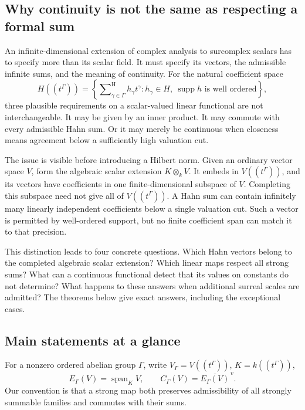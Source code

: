 \documentclass[11pt,letterpaper]{article}
\numberwithin{equation}{section}
\theoremstyle{definition}
\theoremstyle{remark}
\newcommand{\supp}{\operatorname{supp}}
\newcommand{\Span}{\operatorname{span}}
\newcommand{\sH}{\mathop{\sum}\nolimits^{\mathrm H}}
\begin{document}
\subsection{Why continuity is not the same as respecting a formal sum}
An infinite-dimensional extension of complex analysis to surcomplex
scalars has to specify more than its scalar field. It must specify its
vectors, the admissible infinite sums, and the meaning of continuity.
For the natural coefficient space
\[
 H((t^\Gamma))=\left\{\sH_{\gamma\in\Gamma}h_\gamma t^\gamma:
 h_\gamma\in H,\ \supp h\text{ is well ordered}\right\},
\]
three plausible requirements on a scalar-valued linear functional are
not interchangeable. It may be given by an inner product. It may commute
with every admissible Hahn sum. Or it may merely be continuous when
closeness means agreement below a sufficiently high valuation cut.

The issue is visible before introducing a Hilbert norm. Given an
ordinary vector space $V$, form the algebraic scalar extension
$K\otimes_k V$. It embeds in $V((t^\Gamma))$, and its vectors have
coefficients in one finite-dimensional subspace of $V$. Completing this
subspace need not give all of $V((t^\Gamma))$. A Hahn sum can contain
infinitely many linearly independent coefficients below a single
valuation cut. Such a vector is permitted by well-ordered support, but
no finite coefficient span can match it to that precision.

This distinction leads to four concrete questions. Which Hahn vectors
belong to the completed algebraic scalar extension? Which linear maps
respect all strong sums? What can a continuous functional detect that
its values on constants do not determine? What happens to these answers
when additional surreal scales are admitted? The theorems below give
exact answers, including the exceptional cases.

\subsection{Main statements at a glance}
For a nonzero ordered abelian group $\Gamma$, write
$V_\Gamma=V((t^\Gamma))$, $K=k((t^\Gamma))$,
\[
 E_\Gamma(V)=\Span_K V,\qquad
 C_\Gamma(V)=\overline{E_\Gamma(V)}^{\,v}.
\]
Our convention is that a strong map both preserves admissibility of all
strongly summable families and commutes with their sums.
\end{document}
